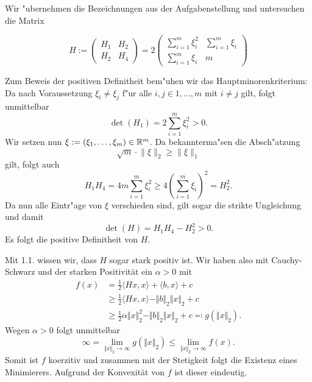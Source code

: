 Wir "ubernehmen die Bezeichnungen aus der Aufgabenstellung und untersuchen die Matrix

\[
H:=
\begin{pmatrix}
H_1 & H_2 \\ H_2 & H_4 \end{pmatrix}
= 2 \begin{pmatrix}
\sum_{i=1}^m \xi_i^2 & \sum_{i=1}^m \xi_i \\
\sum_{i=1}^m \xi_i & m
\end{pmatrix}
\]
\begin{compactenum}[(i)]
\item Zum Beweis der positiven Definitheit
bem"uhen wir das Hauptminorenkriterium: Da
nach Voraussetzung $\xi_i \neq \xi_j$ f"ur alle $i,j \in {1,\ldots,m}$ mit $i\neq j$ gilt, folgt unmittelbar
\[
\det(H_1) = 2\sum_{i=1}^m \xi_i^2 > 0.
\]
Wir setzen nun $\xi := (\xi_1,\ldots,\xi_m)\in\mathbb{R}^m$. Da bekannterma"sen die Absch"atzung
\[
\sqrt m\cdot \lVert \xi \rVert_2 \ge \lVert \xi \rVert_1
\]
gilt, folgt auch
\[
H_1 H_4 = 4 m \sum_{i=1}^m \xi_i^2
\ge 4\left(\sum_{i=1}^m \xi_i\right)^2
= H_2^2.
\]
Da nun alle Eintr"age von $\xi$ verschieden
sind, gilt sogar die strikte Ungleichung und
damit
\[
\det(H) = H_1 H_4 - H_2^2 > 0.
\]
Es folgt die positive Definitheit von $H$.\\

 \item Mit 1.1. wissen wir, dass $H$ sogar stark positiv ist. Wir haben also mit Cauchy-Schwarz und der starken Positivität
 ein $\alpha > 0$ mit
 \begin{align*}
  f(x)&=\frac{1}{2}\langle Hx,x\rangle+\langle b, x\rangle+c\\
  &\geq\frac{1}{2}\langle Hx,x\rangle-\Vert b\Vert_2\Vert x\Vert_2+c\\
  &\geq\frac{1}{2}\alpha\Vert x\Vert_2^2-\Vert b\Vert_2\Vert x\Vert_2+c \eqqcolon g(\Vert x\Vert_2).
 \end{align*}
 Wegen $\alpha >0$ folgt unmittelbar
 \begin{displaymath}
  \infty=\lim_{\Vert x\Vert_2\to\infty}g(\Vert x\Vert_2)\leq \lim_{\Vert x\Vert_2\to\infty} f(x).
 \end{displaymath}
 Somit ist $f$ koerzitiv und zusammen mit der Stetigkeit folgt die Existenz eines Minimierers. Aufgrund der Konvexität von $f$ ist dieser eindeutig.

\end{compactenum}
